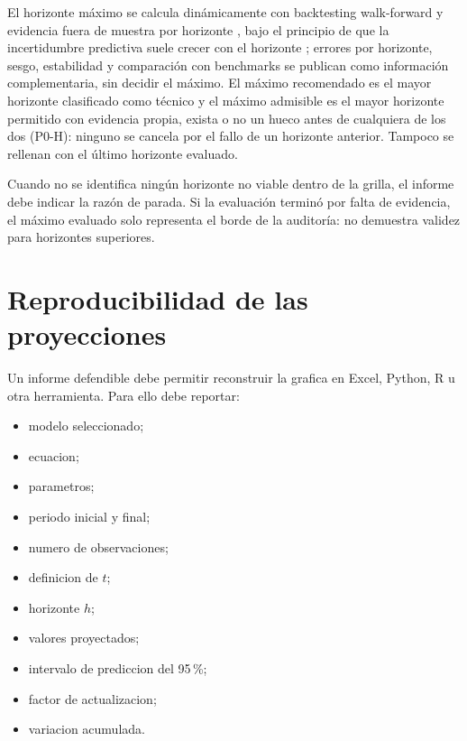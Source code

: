 ﻿\documentclass[12pt,letterpaper]{article}
\begin{document}
El horizonte máximo se calcula dinámicamente con backtesting walk-forward y evidencia fuera de muestra por horizonte \citep{tashman2000}, bajo el principio de que la incertidumbre predictiva suele crecer con el horizonte \citep{hyndman2021fpp3}; errores por horizonte, sesgo, estabilidad y comparación con benchmarks se publican como información complementaria, sin decidir el máximo. El máximo recomendado es el mayor horizonte clasificado como técnico y el máximo admisible es el mayor horizonte permitido con evidencia propia, exista o no un hueco antes de cualquiera de los dos (P0-H): ninguno se cancela por el fallo de un horizonte anterior. Tampoco se rellenan con el último horizonte evaluado.

Cuando no se identifica ningún horizonte no viable dentro de la grilla, el informe debe indicar la razón de parada. Si la evaluación terminó por falta de evidencia, el máximo evaluado solo representa el borde de la auditoría: no demuestra validez para horizontes superiores.




\section{Reproducibilidad de las proyecciones}

Un informe defendible debe permitir reconstruir la grafica en Excel, Python, R u otra herramienta. Para ello debe reportar:

\begin{itemize}[leftmargin=*]
    \item modelo seleccionado;
    \item ecuacion;
    \item parametros;
    \item periodo inicial y final;
    \item numero de observaciones;
    \item definicion de \(t\);
    \item horizonte \(h\);
    \item valores proyectados;
    \item intervalo de prediccion del 95\,\%;
    \item factor de actualizacion;
    \item variacion acumulada.
\end{itemize}
\end{document}
